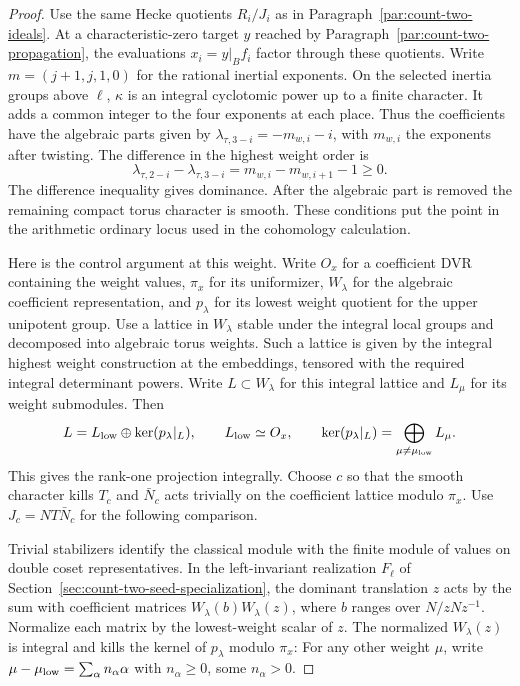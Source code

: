 \begin{proof}
Use the same Hecke quotients \(R_i/J_i\) as in
Paragraph~\ref{par:count-two-ideals}. At a characteristic-zero
target \(y\) reached by Paragraph~\ref{par:count-two-propagation},
the evaluations \(x_i=y|_B f_i\) factor through these quotients.
Write \(m=(j+1,j,1,0)\) for the rational inertial exponents.
On the selected inertia groups above \(\ell\), \(\kappa\) is
an integral cyclotomic power up to a finite character. It
adds a common integer to the four exponents at each place.
Thus the coefficients have the algebraic parts given by
\(\lambda_{\tau,3-i}=-m_{w,i}-i\), with \(m_{w,i}\) the exponents
after twisting. The difference in the highest weight order is
\[
       \lambda_{\tau,2-i}-\lambda_{\tau,3-i}
                  =m_{w,i}-m_{w,i+1}-1\ge0 .
\]
The difference inequality gives dominance. After the algebraic
part is removed the remaining compact torus character is smooth. These conditions put the point in the arithmetic ordinary locus used in the cohomology calculation.

Here is the control argument at this weight. Write \(O_x\)
for a coefficient DVR containing the weight values, \(\pi_x\)
for its uniformizer, \(W_\lambda\) for the algebraic coefficient
representation, and \(p_\lambda\) for its lowest weight quotient
for the upper unipotent group. Use a lattice in \(W_\lambda\)
stable under the integral local groups and decomposed into
algebraic torus weights. Such a lattice is given by the integral
highest weight construction at the embeddings, tensored with
the required integral determinant powers. Write \(L\subset W_\lambda\) for this integral lattice and \(L_\mu\) for its weight submodules. Then
\[
 L=L_{\rm low}\oplus\ker(p_\lambda|_L),\qquad L_{\rm low}\simeq O_x,
 \qquad \ker(p_\lambda|_L)=\bigoplus_{\mu\ne\mu_{\rm low}}L_\mu .
\]
This gives the rank-one projection integrally.
Choose \(c\) so that the smooth character kills \(T_c\) and
\(\bar N_c\) acts trivially on the coefficient lattice modulo \(\pi_x\).
Use \(J_c=NT\bar N_c\) for the following comparison.

Trivial stabilizers identify the classical module with the
finite module of values on double coset representatives.
In the left-invariant realization \(F_\ell\) of
Section~\ref{sec:count-two-seed-specialization}, the dominant
translation \(z\) acts by the sum with coefficient matrices
\(W_\lambda(b)W_\lambda(z)\), where \(b\) ranges over
\(N/zNz^{-1}\). Normalize each matrix by the lowest-weight
scalar of \(z\). The normalized \(W_\lambda(z)\) is integral
and kills the kernel of \(p_\lambda\) modulo \(\pi_x\):
For any other weight \(\mu\), write
\(\mu-\mu_{\rm low}=\sum_\alpha n_\alpha\alpha\) with
\(n_\alpha\ge0\), some \(n_\alpha>0\).


\end{proof}
